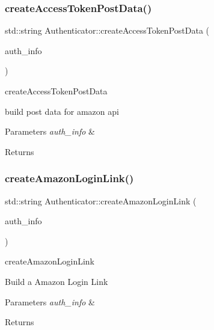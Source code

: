 \subsubsection{\texorpdfstring{create\+Access\+Token\+Post\+Data()}{createAccessTokenPostData()}}
{\footnotesize\ttfamily std\+::string Authenticator\+::create\+Access\+Token\+Post\+Data (\begin{DoxyParamCaption}\item[{\hyperlink{classAuth_1_1AuthInfo}{Auth\+Info} $\ast$}]{auth\+\_\+info }\end{DoxyParamCaption})\hspace{0.3cm}{\ttfamily [protected]}}



create\+Access\+Token\+Post\+Data 

build post data for amazon api 
\begin{DoxyParams}{Parameters}
{\em auth\+\_\+info} & \\
\hline
\end{DoxyParams}
\begin{DoxyReturn}{Returns}

\end{DoxyReturn}
\mbox{\label{classAuth_1_1Authenticator_a7b2e8bca0377fe2a935f679b70069043}} 
\subsubsection{\texorpdfstring{create\+Amazon\+Login\+Link()}{createAmazonLoginLink()}}
{\footnotesize\ttfamily std\+::string Authenticator\+::create\+Amazon\+Login\+Link (\begin{DoxyParamCaption}\item[{\hyperlink{classAuth_1_1AuthInfo}{Auth\+Info} $\ast$}]{auth\+\_\+info }\end{DoxyParamCaption})}



create\+Amazon\+Login\+Link 

Build a Amazon Login Link 
\begin{DoxyParams}{Parameters}
{\em auth\+\_\+info} & \\
\hline
\end{DoxyParams}
\begin{DoxyReturn}{Returns}

\end{DoxyReturn}
\mbox{\label{classAuth_1_1Authenticator_adb3592c127b89984e9fb3d621175f0a0}} 

